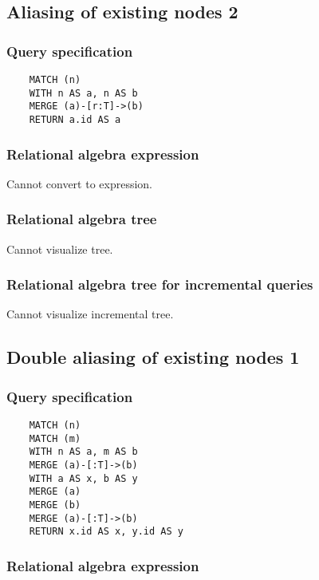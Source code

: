 	\subsection{Aliasing of existing nodes 2}

	\subsubsection*{Query specification}

	\begin{lstlisting}
	MATCH (n)
	WITH n AS a, n AS b
	MERGE (a)-[r:T]->(b)
	RETURN a.id AS a
	\end{lstlisting}


	\subsubsection*{Relational algebra expression}

	Cannot convert to expression.

	\subsubsection*{Relational algebra tree}

	Cannot visualize tree.

	\subsubsection*{Relational algebra tree for incremental queries}

	Cannot visualize incremental tree.
	\subsection{Double aliasing of existing nodes 1}

	\subsubsection*{Query specification}

	\begin{lstlisting}
	MATCH (n)
	MATCH (m)
	WITH n AS a, m AS b
	MERGE (a)-[:T]->(b)
	WITH a AS x, b AS y
	MERGE (a)
	MERGE (b)
	MERGE (a)-[:T]->(b)
	RETURN x.id AS x, y.id AS y
	\end{lstlisting}


	\subsubsection*{Relational algebra expression}

